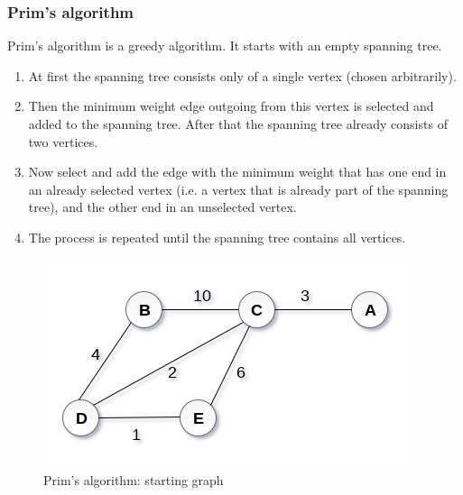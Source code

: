 \documentclass[a4paper,11pt]{book}
\begin{document}
% 
% 
% 
% 
% 
% 
% 

\subsubsection{Prim's algorithm}

\noindent Prim's algorithm is a greedy algorithm. It starts with an empty spanning tree.
\begin{enumerate}
    \item At first the spanning tree consists only of a single vertex (chosen arbitrarily). 
    \item Then the minimum weight edge outgoing from this vertex is selected and added to the spanning tree. After that the spanning tree already consists of two vertices. 
    \item Now select and add the edge with the minimum weight that has one end in an already selected vertex (i.e. a vertex that is already part of the spanning tree), and the other end in an unselected vertex. 
    \item The process is repeated until the spanning tree contains all vertices.
\end{enumerate}

\begin{figure}[ht]
	\centering
	\includegraphics[scale=0.45]{code/sort/pic/prim1.png}
	\caption{Prim's algorithm: starting graph}
	\label{fig:prim1}
\end{figure}
\end{document}
